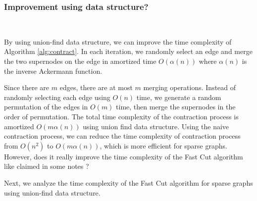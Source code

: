 \documentclass[11pt]{article}
\theoremstyle{plain}
\begin{document}
\subsubsection{Improvement using data structure?}\

By using union-find data structure, we can improve the time complexity of Algorithm \ref{alg:contract}. In each iteration, we randomly select an edge and merge the two supernodes on the edge in amortized time $O(\alpha(n))$ where $\alpha(n)$ is the inverse Ackermann function. 

Since there are $m$ edges,  there are at most $m$ merging operations. Instead of randomly selecting each edge using $O(n)$ time, we generate a random permutation of the edges in $O(m)$ time, then merge the supernodes in the order of permutation. The total time complexity of the contraction process is amortized $O(m\alpha(n))$ using union find data structure. Using the naive contraction process, we can reduce the time complexity of contraction process from $O(n^2)$ to $O(m\alpha(n))$, which is more efficient for sparse graphs. However, does it really improve the time complexity of the Fast Cut algorithm like claimed in some notes\cite{CS161Lecture16} ?

Next, we analyze the time complexity of the Fast Cut algorithm for sparse graphs using union-find data structure.


\end{document}
